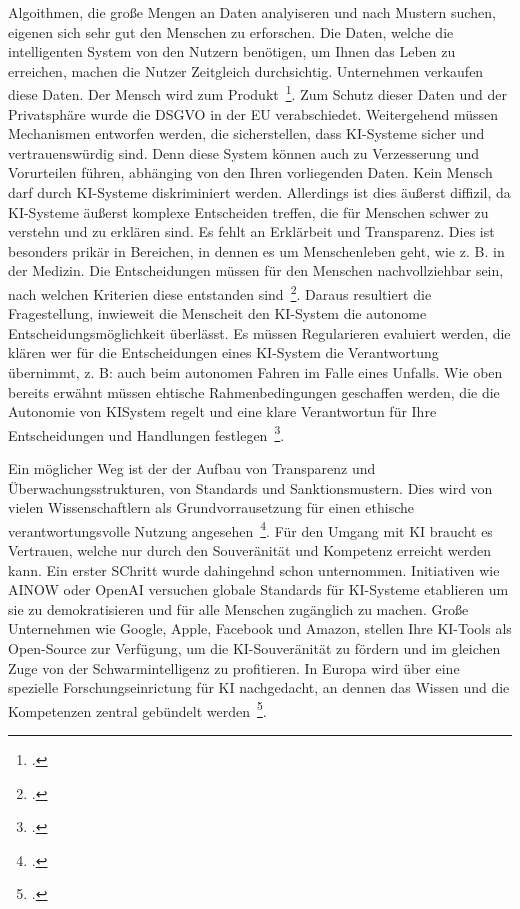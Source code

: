 Algoithmen, die große Mengen an Daten analyiseren und nach Mustern suchen, eigenen sich sehr gut den Menschen zu erforschen. Die Daten, welche die intelligenten System von den 
Nutzern benötigen, um Ihnen das Leben zu erreichen, machen die Nutzer Zeitgleich durchsichtig. Unternehmen verkaufen diese Daten. Der Mensch wird zum Produkt~\footcite[\vglf][]{Lenzen.2020}.
Zum Schutz dieser Daten und der Privatsphäre wurde die \ac{DSGVO} in der \ac{EU} verabschiedet. Weitergehend müssen Mechanismen entworfen werden, die sicherstellen, dass
\ac{KI}-Systeme sicher und vertrauenswürdig sind. 
Denn diese System können auch zu Verzesserung und Vorurteilen führen, abhänging von den Ihren vorliegenden Daten. Kein Mensch darf durch \ac{KI}-Systeme diskriminiert werden.
Allerdings ist dies äußerst diffizil, da \ac{KI}-Systeme äußerst komplexe Entscheiden treffen, die für Menschen schwer zu verstehn und zu erklären sind. Es fehlt an 
Erklärbeit und Transparenz. Dies ist besonders prikär in Bereichen, in dennen es um Menschenleben geht, wie z. B. in der Medizin. Die Entscheidungen müssen für den Menschen 
nachvollziehbar sein, nach welchen Kriterien diese entstanden sind~\footcite[\vglf][]{Wittpahl.2018}.
Daraus resultiert die Fragestellung, inwieweit die Menscheit den \ac{KI}-System die autonome Entscheidungsmöglichkeit überlässt. Es müssen Regularieren evaluiert werden,
die klären wer für die Entscheidungen eines \ac{KI}-System die Verantwortung übernimmt, z. B: auch beim autonomen Fahren im Falle eines Unfalls. Wie oben bereits erwähnt müssen ehtische Rahmenbedingungen geschaffen werden, 
die die Autonomie von \ac{KI}System regelt und eine klare Verantwortun für Ihre Entscheidungen und Handlungen festlegen~\footcite[\vglf][]{Robot.2023}.

Ein möglicher Weg ist der der Aufbau von Transparenz und Überwachungsstrukturen, von Standards und Sanktionsmustern. Dies wird von vielen Wissenschaftlern als Grundvorrausetzung
für einen ethische verantwortungsvolle Nutzung angesehen~\footcite[\vglf][]{Wittpahl.2018}. Für den Umgang mit \ac{KI} braucht es Vertrauen, welche nur durch den
Souveränität und Kompetenz erreicht werden kann. Ein erster SChritt wurde dahingehnd schon unternommen. Initiativen wie AINOW oder OpenAI versuchen globale Standards für \ac{KI}-Systeme
etablieren um sie zu demokratisieren und für alle Menschen zugänglich zu machen. Große Unternehmen wie Google, Apple, Facebook und Amazon, stellen Ihre KI-Tools als 
Open-Source zur Verfügung, um die KI-Souveränität zu fördern und im gleichen Zuge von der Schwarmintelligenz zu profitieren. In Europa wird über eine spezielle
Forschungseinrictung für KI nachgedacht, an dennen das Wissen und die Kompetenzen zentral gebündelt werden~\footcite[\vglf][]{Wittpahl.2018}.

